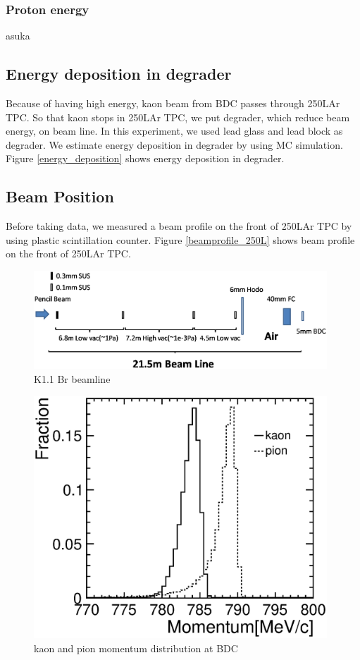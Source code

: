    \subsubsection{Proton energy}\label{proton_energy_section}
   asuka




   \subsection{Energy deposition in degrader}
   Because of having high energy, kaon beam from BDC passes through 250LAr TPC.
   So that kaon stops in 250LAr TPC, we put degrader, which reduce
   beam energy, on beam line.
   In this experiment, we used lead glass and lead block as degrader.
   We estimate energy deposition in degrader by using MC simulation.
   Figure \ref{energy_deposition} shows energy deposition in degrader.
   
   \subsection{Beam Position}
   Before taking data, we measured a beam profile on the front of
   250LAr TPC by using plastic scintillation counter.
   Figure \ref{beamprofile_250L} shows beam profile on the front of
   250LAr TPC.

   \begin{figure}[!htb]
    \centering
    \centering
    \includegraphics[width=11cm,clip]{./fig/K11Br_beamline_sim.eps}
    \caption{K1.1 Br beamline}
    \label{K11Br_Beam_line}
   \end{figure}



   \begin{figure}[!htb]
    \centering
    \centering
    \includegraphics[width=11cm,clip]{./fig/Kaon_pion_momentum_nogrid.eps}
    \caption{kaon and pion momentum distribution at BDC}
    \label{k_pi_momentum}
   \end{figure}


